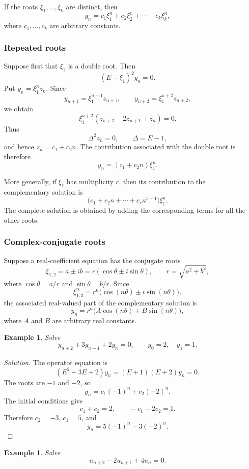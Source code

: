 \documentclass[11pt,a4paper]{article}
\numberwithin{equation}{section}
\theoremstyle{spacedplain}
\theoremstyle{spaceddefinition}
\newtheorem{example}[theorem]{Example}
\theoremstyle{spacedremark}
\begin{document}
If the roots \(\xi_1,\ldots,\xi_k\) are distinct, then
\[
  y_n=c_1\xi_1^n+c_2\xi_2^n+\cdots+c_k\xi_k^n,
\]
where \(c_1,\ldots,c_k\) are arbitrary constants.

\subsubsection{Repeated roots}

Suppose first that \(\xi_1\) is a double root.  Then
\[
  (E-\xi_1)^2y_n=0.
\]
Put \(y_n=\xi_1^n z_n\).  Since
\[
  y_{n+1}=\xi_1^{n+1}z_{n+1},
  \qquad
  y_{n+2}=\xi_1^{n+2}z_{n+2},
\]
we obtain
\[
  \xi_1^{n+2}(z_{n+2}-2z_{n+1}+z_n)=0.
\]
Thus
\[
  \Delta^2z_n=0,
  \qquad \Delta=E-1,
\]
and hence \(z_n=c_1+c_2n\).  The contribution associated with the
double root is therefore
\[
  y_n=(c_1+c_2n)\xi_1^n.
\]

More generally, if \(\xi_1\) has multiplicity \(r\), then its contribution
to the complementary solution is
\[
  \bigl(c_1+c_2n+\cdots+c_rn^{r-1}\bigr)\xi_1^n.
\]
The complete solution is obtained by adding the corresponding terms for
all the other roots.

\subsubsection{Complex-conjugate roots}

Suppose a real-coefficient equation has the conjugate roots
\[
  \xi_{1,2}=a\pm ib
  =r(\cos\theta\pm i\sin\theta),
  \qquad
  r=\sqrt{a^2+b^2},
\]
where \(\cos\theta=a/r\) and \(\sin\theta=b/r\).  Since
\[
  \xi_{1,2}^n=r^n\bigl(\cos(n\theta)\pm i\sin(n\theta)\bigr),
\]
the associated real-valued part of the complementary solution is
\[
  y_n=r^n\bigl(A\cos(n\theta)+B\sin(n\theta)\bigr),
\]
where \(A\) and \(B\) are arbitrary real constants.

\begin{example}
Solve
\[
  y_{n+2}+3y_{n+1}+2y_n=0,
  \qquad y_0=2,\quad y_1=1.
\]
\end{example}

\begin{proof}[Solution]
The operator equation is
\[
  (E^2+3E+2)y_n=(E+1)(E+2)y_n=0.
\]
The roots are \(-1\) and \(-2\), so
\[
  y_n=c_1(-1)^n+c_2(-2)^n.
\]
The initial conditions give
\[
  c_1+c_2=2,
  \qquad
  -c_1-2c_2=1.
\]
Therefore \(c_2=-3\), \(c_1=5\), and
\[
  \boxed{y_n=5(-1)^n-3(-2)^n.}
\]
\end{proof}

\begin{example}
Solve
\[
  u_{n+2}-2u_{n+1}+4u_n=0.
\]
\end{example}
\end{document}
